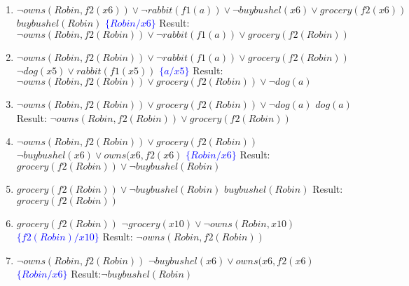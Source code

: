 \documentclass[11pt]{article}
\begin{document}
\begin{enumerate}
\begin{enumerate}
\item $ \neg owns(Robin,f2(x6))  \lor \neg rabbit(f1(a)) \lor \neg buybushel(x6)  \lor  grocery(f2(x6))$ \hspace{1cm} $buybushel(Robin)$ \hspace{1cm}\textcolor{blue}{ $\{Robin/x6\}$ } \newline 
Result: $ \neg owns(Robin,f2(Robin)) \lor \neg rabbit(f1(a)) \lor grocery(f2(Robin))$ 

\item $ \neg owns(Robin,f2(Robin)) \lor \neg rabbit(f1(a)) \lor grocery(f2(Robin))$ \hspace{1cm} $\neg dog(x5) \lor rabbit(f1(x5))$ \hspace{1cm}\textcolor{blue}{ $\{a/x5\}$ } \newline 
Result: $ \neg owns(Robin,f2(Robin)) \lor grocery(f2(Robin)) \lor \neg dog(a)$

\item $ \neg owns(Robin,f2(Robin)) \lor grocery(f2(Robin)) \lor \neg dog(a)$ \hspace{1cm} $dog(a)$ \hspace{1cm}   \newline 
Result: $ \neg owns(Robin,f2(Robin)) \lor grocery(f2(Robin))$ 

\item $ \neg owns(Robin,f2(Robin)) \lor grocery(f2(Robin))$ \hspace{1cm} $\neg buybushel(x6) \lor owns(x6,f2(x6)$ \hspace{1cm}\textcolor{blue}{ $\{Robin/x6\}$ } \newline 
Result: $ grocery(f2(Robin)) \lor \neg buybushel(Robin)$

\item $ grocery(f2(Robin)) \lor \neg buybushel(Robin)$ \hspace{1cm} $buybushel(Robin)$ \hspace{1cm}   \newline 
Result: $ grocery(f2(Robin))$ 

\item $ grocery(f2(Robin))$ \hspace{1cm} $ \neg grocery(x10) \lor \neg owns(Robin,x10)$ \hspace{1cm}\textcolor{blue}{ $\{f2(Robin)/x10\}$ } \newline 
Result: $ \neg owns(Robin,f2(Robin)) $ 

\item $ \neg owns(Robin,f2(Robin)) $ \hspace{1cm} $\neg buybushel(x6) \lor owns(x6,f2(x6)$ \hspace{1cm}\textcolor{blue}{ $\{Robin/x6\}$}  \newline 
Result:$\neg buybushel(Robin)$  


\end{enumerate}
\end{enumerate}
\end{document}
